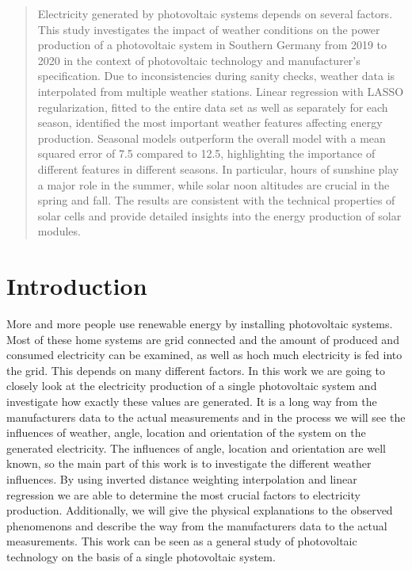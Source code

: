 \documentclass{article}
\begin{document}
\printAffiliationsAndNotice{\icmlEqualContribution} %

\begin{abstract}
Electricity generated by photovoltaic systems depends on several factors. This study investigates the impact of weather conditions on the power production of a photovoltaic system in Southern Germany from 2019 to 2020 in the context of photovoltaic technology and manufacturer's specification. Due to inconsistencies during sanity checks, weather data is interpolated from multiple weather stations. Linear regression with LASSO regularization, fitted to the entire data set as well as separately for each season, identified the most important weather features affecting energy production. Seasonal models outperform the overall model with a mean squared error of 7.5 compared to 12.5, highlighting the importance of different features in different seasons. In particular, hours of sunshine play a major role in the summer, while solar noon altitudes are crucial in the spring and fall. The results are consistent with the technical properties of solar cells and provide detailed insights into the energy production of solar modules. 
\end{abstract}

\section{Introduction}\label{sec:intro}
More and more people use renewable energy by installing photovoltaic systems. 
Most of these home systems are grid connected and the amount of produced and consumed electricity can be examined, as well as hoch much electricity is fed into the grid.
This depends on many different factors.
In this work we are going to closely look at the electricity production of a single photovoltaic system and investigate how exactly these values are generated.
It is a long way from the manufacturers data to the actual measurements and in the process we will see the influences of weather, angle, location and orientation of the system on the generated electricity.
The influences of angle, location and orientation are well known, so the main part of this work is to investigate the different weather influences.
By using inverted distance weighting interpolation and linear regression we are able to determine the most crucial factors to electricity production.
Additionally, we will give the physical explanations to the observed phenomenons and describe the way from the manufacturers data to the actual measurements.
This work can be seen as a general study of photovoltaic technology on the basis of a single photovoltaic system. 
\end{document}
